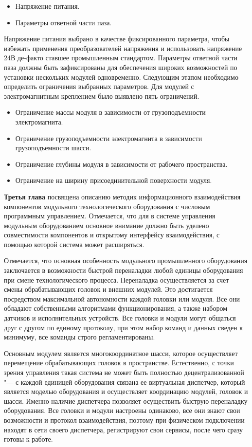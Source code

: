\begin{itemize}
	\item Напряжение питания.
	\item Параметры ответной части паза.
\end{itemize}

Напряжение питания выбрано в качестве фиксированного параметра, чтобы избежать применения преобразователей напряжения и использовать напряжение 24\:В де-факто ставшее промышленным стандартом. Параметры ответной части паза должны быть зафиксированы для обеспечения  широких возможностей по установки нескольких модулей одновременно. Следующим этапом необходимо определить ограничения выбранных параметров. Для модулей с электромагнитным креплением было выявлено пять ограничений.

\begin{itemize}
	\item Ограничение массы модуля в зависимости от грузоподъемности электромагнита.
	\item Ограничение грузоподъемности электромагнита в зависимости грузоподъемности шасси.
	\item Ограничение глубины модуля в зависимости от рабочего пространства.
	\item Ограничение на ширину присоединительной поверхности модуля.
\end{itemize}


\textbf{Третья глава} посвящена описанию методик информационного взаимодействия компонентов модульного технологического оборудования с числовым программным управлением. Отмечается, что для в системе управления модульным оборудованием основное внимание должно быть уделено совместимости компонентов и открытому интерфейсу взаимодействия, с помощью которой система может расширяться. 

Отмечается, что основная особенность модульного промышленного оборудования заключается в возможности быстрой переналадки любой единицы оборудования при смене технологического процесса. Переналадка осуществляется за счет смены обрабатывающих головок и внешних модулей.  Это достигается посредством максимальной автономности каждой головки или модуля. Все они обладают собственными алгоритмами функционирования, а также набором датчиков и исполнительных устройств. Все головки и модули могут общаться друг с другом по единому протоколу, при этом набор команд и данных сведен к минимуму, все команды строго регламентированы.

Основным модулем является многокоординатное шасси, которое осуществляет перемещение обрабатывающих головок в пространстве. Естественно, с точки зрения управления такая система не может быть полностью децентрализованной "--- с каждой единицей оборудования связана ее виртуальная диспетчер, который является моделью оборудования и осуществляет координацию модулей, головок и шасси. Именно наличие диспетчера позволяет осуществить быструю переналадку оборудования. Все головки и модули настроены одинаково, все они знают свои возможности и протокол взаимодействия, поэтому при физическом подключении находят в сети своего диспетчера, регистрируют свои сервисы, после чего сразу готовы к работе.

